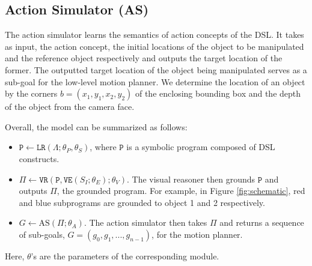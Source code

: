 %


\subsection{Action Simulator (AS)}
\label{subsec:action-simulator}
The action simulator learns the semantics of action concepts of the DSL. It takes as input, the action concept, the initial locations  of the object to be manipulated and the reference object respectively and outputs the target location of the former. The outputted target location of the object being manipulated serves as a sub-goal for the low-level motion planner. We determine the location of an object by the corners $b = (x_1,y_1,x_2,y_2)$ of the enclosing bounding box and the depth of the object from the camera face. 

\noindent  
Overall, the model can be summarized as follows:
\begin{itemize}
    \item $\mathtt{P} \leftarrow \mathtt{LR}(\Lambda; \theta_P, \theta_S)$, where $\mathtt{P}$ is a symbolic program composed of DSL constructs. 
    \item $\Pi \leftarrow \mathtt{VR}(\mathtt{P}, \mathtt{VE}(S_I;\theta_E);\theta_V)$. The visual reasoner then grounds $\texttt{P}$ and outputs $\Pi$, the grounded program. For example, in Figure \ref{fig:schematic}, red and blue subprograms are grounded to object 1 and 2 respectively.
    \item $G \leftarrow \text{AS}(\Pi; \theta_A)$. The action simulator then takes $\Pi$ and returns a sequence of sub-goals, $G = (g_0, g_1, ..., g_{n-1})$, for the motion planner.
\end{itemize}
Here, $\theta$'s are the parameters of the corresponding  module. 

